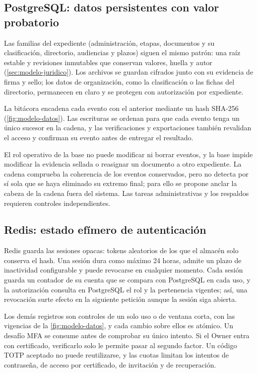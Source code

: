 \subsection{PostgreSQL: datos persistentes con valor probatorio}\label{sec:postgresql}

Las familias del expediente (administración, etapas, documentos y su clasificación, directorio, audiencias y plazos) siguen el mismo patrón: una raíz estable y revisiones inmutables que conservan valores, huella y autor (\cref{sec:modelo-juridico}). Los archivos se guardan cifrados junto con su evidencia de firma y sello; los datos de organización, como la clasificación o las fichas del directorio, permanecen en claro y se protegen con autorización por expediente.

La bitácora encadena cada evento con el anterior mediante un hash SHA-256 (\cref{fig:modelo-datos}). Las escrituras se ordenan para que cada evento tenga un único sucesor en la cadena, y las verificaciones y exportaciones también revalidan el acceso y confirman su evento antes de entregar el resultado.

El rol operativo de la base no puede modificar ni borrar eventos, y la base impide modificar la evidencia sellada o reasignar un documento a otro expediente. La cadena comprueba la coherencia de los eventos conservados, pero no detecta por sí sola que se haya eliminado su extremo final; para ello se propone anclar la cabeza de la cadena fuera del sistema. Las tareas administrativas y los respaldos requieren controles independientes.

\subsection{Redis: estado efímero de autenticación}\label{sec:redis}

Redis guarda las sesiones opacas: tokens aleatorios de los que el almacén solo conserva el hash. Una sesión dura como máximo 24 horas, admite un plazo de inactividad configurable y puede revocarse en cualquier momento. Cada sesión guarda un contador de su cuenta que se compara con PostgreSQL en cada uso, y la autorización consulta en PostgreSQL el rol y la pertenencia vigentes; así, una revocación surte efecto en la siguiente petición aunque la sesión siga abierta.

Los demás registros son controles de un solo uso o de ventana corta, con las vigencias de la \cref{fig:modelo-datos}, y cada cambio sobre ellos es atómico. Un desafío MFA se consume antes de comprobar su único intento. Si el Owner entra con certificado, verificarlo solo le permite pasar al segundo factor. Un código TOTP aceptado no puede reutilizarse, y las cuotas limitan los intentos de contraseña, de acceso por certificado, de invitación y de recuperación.

